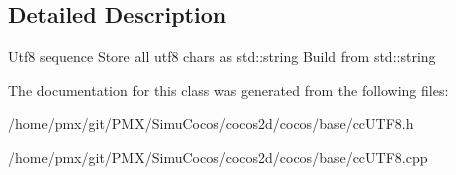 \subsection{Detailed Description}
Utf8 sequence Store all utf8 chars as std\+::string Build from std\+::string 

The documentation for this class was generated from the following files\+:\begin{DoxyCompactItemize}
\item 
/home/pmx/git/\+P\+M\+X/\+Simu\+Cocos/cocos2d/cocos/base/cc\+U\+T\+F8.\+h\item 
/home/pmx/git/\+P\+M\+X/\+Simu\+Cocos/cocos2d/cocos/base/cc\+U\+T\+F8.\+cpp\end{DoxyCompactItemize}
